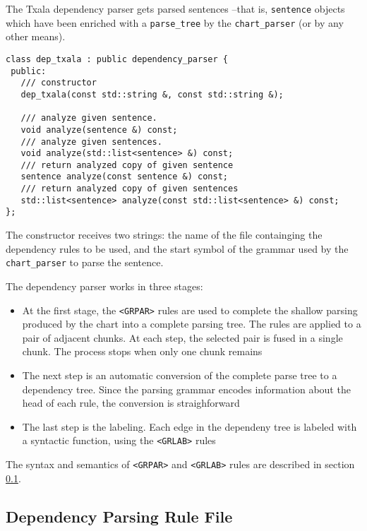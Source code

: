 \documentclass[a4paper]{book}
\begin{document}
  The Txala dependency parser \cite{atserias05} gets parsed sentences --that is, {\tt sentence} objects which have been enriched with a {\tt parse\_tree} by the {\tt chart\_parser} (or by any other means).

\begin{verbatim}
class dep_txala : public dependency_parser {
 public:   
   /// constructor
   dep_txala(const std::string &, const std::string &);

   /// analyze given sentence.
   void analyze(sentence &) const;
   /// analyze given sentences.
   void analyze(std::list<sentence> &) const;
   /// return analyzed copy of given sentence
   sentence analyze(const sentence &) const;
   /// return analyzed copy of given sentences
   std::list<sentence> analyze(const std::list<sentence> &) const;
};
\end{verbatim}

  The constructor receives two strings: the name of the file containging the dependency rules to be used, and the start symbol of the grammar used by the {\tt chart\_parser} to parse the sentence.

   The dependency parser works in three stages:
\begin{itemize}
\item At the first stage, the
   \verb#<GRPAR># rules are used to complete the shallow parsing
   produced by the chart into a complete parsing tree.  The rules are
   applied to a pair of adjacent chunks. At each step, the selected
   pair is fused in a single chunk. The process stops when only one chunk remains

\item The next step is an automatic conversion of the complete parse tree to
  a dependency tree. Since the parsing grammar encodes information about the head of
  each rule, the conversion is straighforward

\item The last step is the labeling. Each edge in the dependeny tree is labeled with a 
  syntactic function, using the \verb#<GRLAB># rules
\end{itemize}

  The syntax and semantics of \verb#<GRPAR># and \verb#<GRLAB># rules are described in 
section \ref{file-dep}.

\subsection{Dependency Parsing Rule File}
\label{file-dep}
\end{document}

